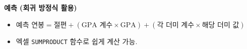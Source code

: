 \documentclass[11pt,a4paper]{book}
\theoremstyle{definition}
\begin{document}
\begin{tcolorbox}[colback=cyan!5!white, colframe=cyan!75!black, title={\textbf{핵심 요약: 다중 범주 더미 변수}}]
\textbf{예측 (회귀 방정식 활용)}
\begin{itemize}
    \item $\text{예측 연봉} = \text{절편} + (\text{GPA 계수} \times \text{GPA}) + (\text{각 더미 계수} \times \text{해당 더미 값})$
    \item 엑셀 \texttt{SUMPRODUCT} 함수로 쉽게 계산 가능.
\end{itemize}
\end{tcolorbox}
\end{document}
